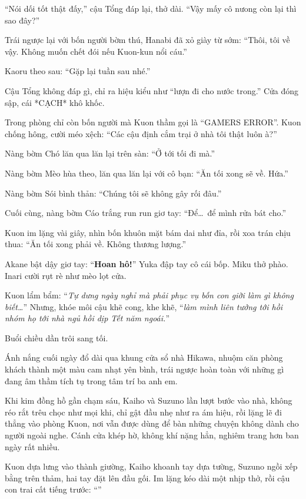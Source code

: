 \documentclass[../main.tex]{subfiles}
\begin{document}
``Nói dối tốt thật đấy,'' cậu Tổng đáp lại, thở dài. ``Vậy mấy cô nưong còn lại thì sao đây?''

Trái ngược lại với bốn người bờm thú, Hanabi đã xỏ giày từ sớm: ``Thôi, tôi về vậy. Không muốn chết đói nếu Kuon-kun nổi cáu.''

Kaoru theo sau: ``Gặp lại tuần sau nhé.''

Cậu Tổng không đáp gì, chỉ ra hiệu kiểu như ``lượn đi cho nước trong.'' Cửa đóng sập, cái *CẠCH* khô khốc.

Trong phòng chỉ còn bốn người mà Kuon thầm gọi là ``GAMERS ERROR''. Kuon chống hông, cười méo xệch: ``Các cậu định cắm trại ở nhà tôi thật luôn à?''

Nàng bờm Chó lăn qua lăn lại trên sàn: ``Ở tới tối đi mà.''

Nàng bờm Mèo hùa theo, lăn qua lăn lại với cô bạn: ``Ăn tối xong sẽ về. Hứa.''

Nàng bờm Sói bình thản: ``Chúng tôi sẽ không gây rối đâu.''

Cuối cùng, nàng bờm Cáo trắng run run giơ tay: ``Để\dots\ để mình rửa bát cho.''

Kuon im lặng vài giây, nhìn bốn khuôn mặt bám dai như đỉa, rồi xoa trán chịu thua: ``Ăn tối xong phải về. Không thương lượng.''

Akane bật dậy giơ tay: ``\textbf{Hoan hô!}'' Yuka đập tay cô cái bốp. Miku thở phào. Inari cười rụt rè như mèo lọt cửa.

Kuon lẩm bẩm: ``\textit{Tự dưng ngày nghỉ mà phải phục vụ bốn con giời làm gì không biết\dots}'' Nhưng, khóe môi cậu khẽ cong, khe khẽ, ``\textit{làm mình liên tưởng tới hồi nhóm họ tới nhà ngủ hồi dịp Tết năm ngoái.}''

Buổi chiều dần trôi sang tối.

Ánh nắng cuối ngày đổ dài qua khung cửa sổ nhà Hikawa, nhuộm căn phòng khách thành một màu cam nhạt yên bình, trái ngược hoàn toàn với những gì đang âm thầm tích tụ trong tâm trí ba anh em.

\ct

Khi kim đồng hồ gần chạm sáu, Kaiho và Suzuno lần lượt bước vào nhà, không réo rắt trêu chọc như mọi khi, chỉ gật đầu nhẹ như ra ám hiệu, rồi lặng lẽ đi thẳng vào phòng Kuon, nơi vẫn được dùng để bàn những chuyện không dành cho người ngoài nghe. Cánh cửa khép hờ, không khí nặng hẳn, nghiêm trang hơn ban ngày rất nhiều.

Kuon dựa lưng vào thành giường, Kaiho khoanh tay dựa tường, Suzuno ngồi xếp bằng trên thảm, hai tay đặt lên đầu gối. Im lặng kéo dài một nhịp thở, rồi cậu con trai cất tiếng trước: ``''
\end{document}
